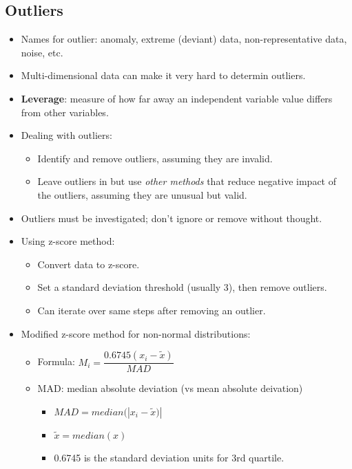 \documentclass[12pt,a4paper]{article}
\begin{document}
\subsection{Outliers}
\begin{itemize}
    \item Names for outlier: anomaly, extreme (deviant) data, non-representative data, noise, etc.
    \item Multi-dimensional data can make it very hard to determin outliers.
    \item \textbf{Leverage}: measure of how far away an independent variable value differs from other variables.
    \item Dealing with outliers:
        \begin{itemize}
            \item Identify and remove outliers, assuming they are invalid.
            \item Leave outliers in but use \textit{other methods} that reduce negative impact of the outliers, assuming they are unusual but valid.
        \end{itemize}
    \item Outliers must be investigated; don't ignore or remove without thought.
    \item Using z-score method:
        \begin{itemize}
            \item Convert data to z-score.
            \item Set a standard deviation threshold (usually 3), then remove outliers.
            \item Can iterate over same steps after removing an outlier.
        \end{itemize}
    \item Modified z-score method for non-normal distributions:
        \begin{itemize}
            \item Formula: \(M_i = \dfrac{0.6745(x_i-\tilde{x})}{MAD}\)
            \item MAD: median absolute deviation (vs mean absolute deivation)
                \begin{itemize}
                    \item \(MAD = median(|x_i-\tilde{x})|\)
                    \item \(\tilde{x}=median(x)\)
                    \item 0.6745 is the standard deviation units for 3rd quartile.
                \end{itemize}
        \end{itemize}
\end{itemize}
\end{document}
